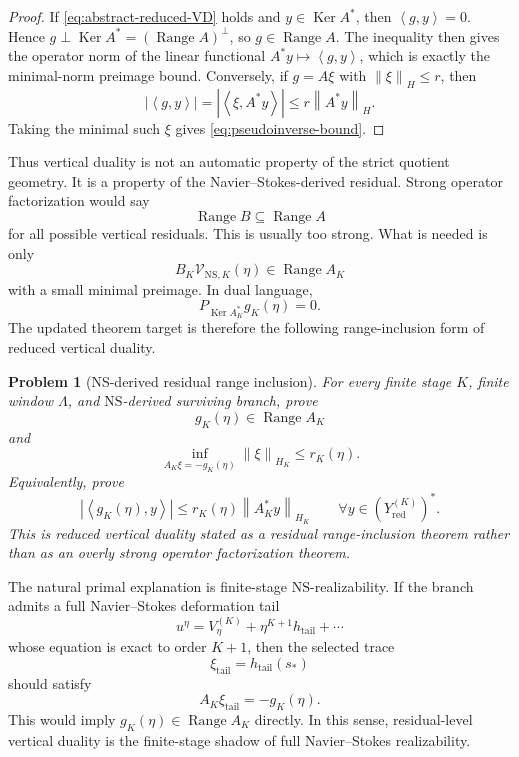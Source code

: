 \documentclass[11pt]{article}
\numberwithin{equation}{section}
\newtheorem{problem}[theorem]{Problem}
\DeclareMathOperator{\Range}{Range}
\DeclareMathOperator{\Ker}{Ker}
\newcommand{\NS}{\mathrm{NS}}
\newcommand{\norm}[2]{\left\|#1\right\|_{#2}}
\newcommand{\ip}[2]{\left\langle #1,#2\right\rangle}
\newcommand{\calV}{\mathcal V}
\begin{document}
\begin{proof}
If \eqref{eq:abstract-reduced-VD} holds and \(y\in\Ker A^*\), then \(\ip{g}{y}=0\).  Hence \(g\perp\Ker A^*=(\Range A)^\perp\), so \(g\in\Range A\).  The inequality then gives the operator norm of the linear functional \(A^*y\mapsto \ip{g}{y}\), which is exactly the minimal-norm preimage bound.  Conversely, if \(g=A\xi\) with \(\norm{\xi}{H}\le r\), then
\[
|\ip{g}{y}|=|\ip{\xi}{A^*y}|
\le r\norm{A^*y}{H}.
\]
Taking the minimal such \(\xi\) gives \eqref{eq:pseudoinverse-bound}.
\end{proof}

Thus vertical duality is not an automatic property of the strict quotient geometry.  It is a property of the Navier--Stokes-derived residual.  Strong operator factorization would say
\[
\Range B\subseteq\Range A
\]
for all possible vertical residuals.  This is usually too strong.  What is needed is only
\begin{equation}\label{eq:NS-derived-range-inclusion}
B_K\calV_{\NS,K}(\eta)
\in\Range A_K
\end{equation}
with a small minimal preimage.  In dual language,
\begin{equation}\label{eq:phantom-projection-zero}
P_{\Ker A_K^*}g_K(\eta)=0.
\end{equation}
The updated theorem target is therefore the following range-inclusion form of reduced vertical duality.

\begin{problem}[NS-derived residual range inclusion]\label{prob:NS-derived-range-inclusion}
For every finite stage \(K\), finite window \(\Lambda\), and \(\NS\)-derived surviving branch, prove
\[
g_K(\eta)\in\Range A_K
\]
and
\[
\inf_{A_K\xi=-g_K(\eta)}\norm{\xi}{H_K}
\le r_K(\eta).
\]
Equivalently, prove
\[
|\ip{g_K(\eta)}{y}|
\le r_K(\eta)\norm{A_K^*y}{H_K}
\qquad
\forall y\in(Y_{\mathrm{red}}^{(K)})^*.
\]
This is reduced vertical duality stated as a residual range-inclusion theorem rather than as an overly strong operator factorization theorem.
\end{problem}

The natural primal explanation is finite-stage \(\NS\)-realizability.  If the branch admits a full Navier--Stokes deformation tail
\[
u^\eta=V_\eta^{(K)}+\eta^{K+1}h_{\mathrm{tail}}+\cdots
\]
whose equation is exact to order \(K+1\), then the selected trace
\[
\xi_{\mathrm{tail}}=h_{\mathrm{tail}}(s_*)
\]
should satisfy
\[
A_K\xi_{\mathrm{tail}}=-g_K(\eta).
\]
This would imply \(g_K(\eta)\in\Range A_K\) directly.  In this sense, residual-level vertical duality is the finite-stage shadow of full Navier--Stokes realizability.
\end{document}
